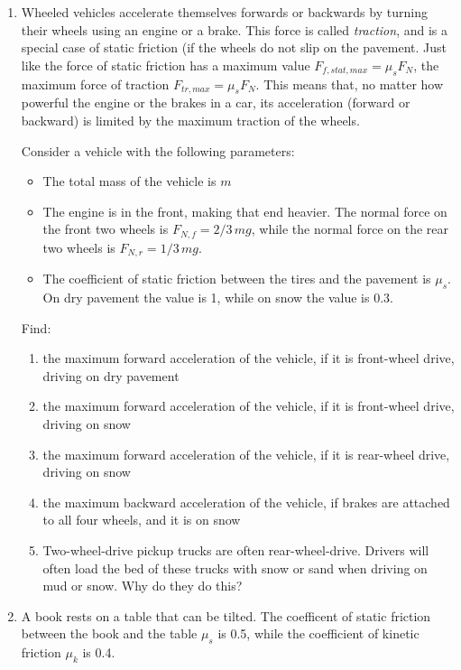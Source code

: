 \documentclass[12pt]{article}
\begin{document}
\begin{enumerate}

\newpage

\item Wheeled vehicles accelerate themselves forwards or backwards by turning their wheels using an engine or a brake. This force is called {\it traction}, and is 
a special case of static friction (if the wheels do not slip on the pavement. Just like the force of static friction has a maximum value $F_{f,stat,max} = \mu_s F_N$, the maximum force of traction $F_{tr, max} = \mu_s F_N$. This means that, no matter how powerful the engine or the brakes in a car, its acceleration (forward or backward)
is limited by the maximum traction of the wheels.

Consider a vehicle with the following parameters:

\begin{itemize}
\item The total mass of the vehicle is $m$
\item The engine is in the front, making that end heavier. The normal force on the front two wheels is $F_{N,f} = 2/3\, mg$, while the normal force on the rear two wheels is
$F_{N,r} = 1/3\, mg$.
\item The coefficient of static friction between the tires and the pavement is $\mu_s$. On dry pavement the value is 1, while on snow the value is 0.3. 
\end{itemize}

Find:

\begin{enumerate}
\item the maximum forward acceleration of the vehicle, if it is front-wheel drive, driving on dry pavement
\newpage
\item the maximum forward acceleration of the vehicle, if it is front-wheel drive, driving on snow
\vspace{1in}
\item the maximum forward acceleration of the vehicle, if it is rear-wheel drive, driving on snow
\vspace{1in}
\item the maximum backward acceleration of the vehicle, if brakes are attached to all four wheels, and it is on snow
\vspace{1in}
\item Two-wheel-drive pickup trucks are often rear-wheel-drive. Drivers will often load the bed of these trucks with snow or sand when driving on mud or snow. Why 
do they do this?
\end{enumerate}
\newpage
\item A book rests on a table that can be tilted. The coefficent of static friction between the book and the table $\mu_s$ is 0.5, while the coefficient of kinetic friction $\mu_k$ is 0.4.


\end{enumerate}
\end{document}
